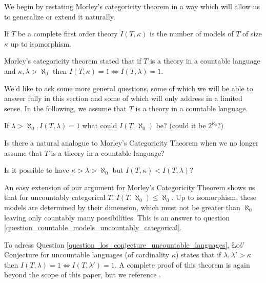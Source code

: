 We begin by restating Morley's categoricity theorem in a way which will allow us to generalize or extend it naturally.

\begin{definition}\label{definition_number_models}
If \(T\) be a complete first order theory \(I(T, \kappa)\) is the number of models of \(T\) of size \(\kappa\) up to isomorphism.
\end{definition}

Morley's categoricity theorem stated that if \(T\) is a theory in a countable language and \(\kappa, \lambda > \aleph_0\) then \(I(T, \kappa) = 1 \iff I(T, \lambda) = 1\). 

We'd like to ask some more general questions, some of which we will be able to answer fully in this section and some of which will only address in a limited sense. 
In the following, we assume that \(T\) is a theory in a countable language. 

\begin{question}\label{question_countable_models_uncountably_categorical}
If \(\lambda > \aleph_0, I(T, \lambda) = 1\) what could \(I(T, \aleph_0)\) be? (could it be \(2^{\aleph_0}\)?)
\end{question}

\begin{question}\label{question_los_conjecture_uncountable_languages}
Is there a natural analogue to Morley's Categoricity Theorem when we no longer assume that \(T\) is a theory in a countable language?
\end{question}

\begin{question}\label{question_morleys_conjecture}
Is it possible to have \(\kappa > \lambda > \aleph_0\) but \(I(T, \kappa) < I(T, \lambda)\)?
\end{question}

An easy extension of our argument for Morley's Categoricity Theorem shows us that for uncountably categorical \(T\), \(I(T, \aleph_0)\leq \aleph_0\).
Up to isomorphism, these models are determined by their dimension, which must not be greater than \(\aleph_0\) leaving only countably many possibilities. 
This is an answer to question \ref{question_countable_models_uncountably_categorical}.

To adress Question \ref{question_los_conjecture_uncountable_languages}, \L o\'s' Conjecture for uncountable languages (of cardinality \(\kappa\)) states that if \(\lambda, \lambda' >\kappa\) then \(I(T, \lambda) = 1 \iff I(T, \lambda') = 1\). 
A complete proof of this theorem is again beyond the scope of this paper, but we reference \cite{shelahUncountable}.

